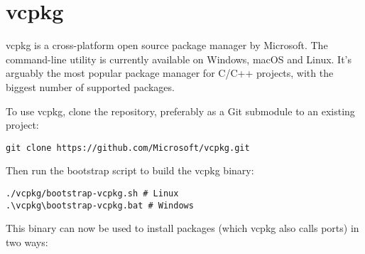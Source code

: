 \documentclass[8pt, table, xcdraw]{article}%
\begin{document}
\section{vcpkg}

vcpkg is a cross-platform open source package manager by Microsoft. The command-line utility is currently available on Windows, macOS and Linux. It's arguably the most popular package manager for C/C++ projects, with the biggest number of supported packages.

To use vcpkg, clone the repository, preferably as a Git submodule to an existing project:

\begin{lstlisting}
git clone https://github.com/Microsoft/vcpkg.git
\end{lstlisting}

Then run the bootstrap script to build the vcpkg binary:

\begin{lstlisting}
./vcpkg/bootstrap-vcpkg.sh # Linux
.\vcpkg\bootstrap-vcpkg.bat # Windows
\end{lstlisting}

This binary can now be used to install packages (which vcpkg also calls ports) in two ways:
\end{document}
